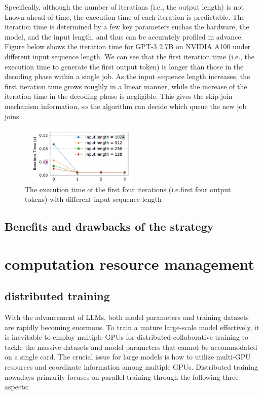 \documentclass[conference]{IEEEtran}
\begin{document}
Specifically, although the number of iterations (i.e., the output length) is not known ahead of time, the execution time of each iteration is predictable. The iteration time is determined by a few key parameters suchas the hardware, the model, and the input length, and thus
can be accurately profiled in advance. Figure below shows the iteration time for GPT-3 2.7B on NVIDIA A100 under different input sequence length. We can see that the first iteration
time (i.e., the execution time to generate the first output token) is longer than those in the decoding phase within a single job. As the input sequence length increases, the first iteration time grows roughly in a linear manner, while the increase of the iteration time in the decoding phase is negligible. This gives the skip-join mechanism information, so the algorithm can decide which queue the new job joins.

\begin{figure}[htbp]
    \centerline{\includegraphics[width=0.5\textwidth]{process fig5.png}}
    \caption{ The execution time of the first four iterations (i.e.first four output tokens) with different input sequence length}
    \label{fig}
\end{figure}

\subsection*{Benefits and drawbacks of the strategy}

\section{computation resource management}
\subsection{distributed training}
With the advancement of LLMs, both model parameters and training datasets are rapidly becoming enormous. To train a mature large-scale model effectively, it is inevitable to employ multiple GPUs for distributed collaborative training to tackle the massive datasets and model parameters that cannot be accommodated on a single card. The crucial issue for large models is how to utilize multi-GPU resources and coordinate information among multiple GPUs. Distributed training nowadays primarily focuses on parallel training through the following three aspects:
\end{document}

